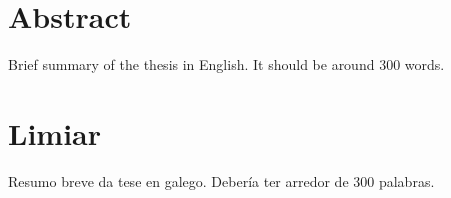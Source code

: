 \chapter*{Abstract}
\label{cha:abstract}

Brief summary of the thesis in English. It should be around 300 words.
\lipsum[1-2]


\chapter*{Limiar}
\label{cha:limiar}

Resumo breve da tese en galego. Debería ter arredor de 300 palabras.
\lipsum[1-2]
